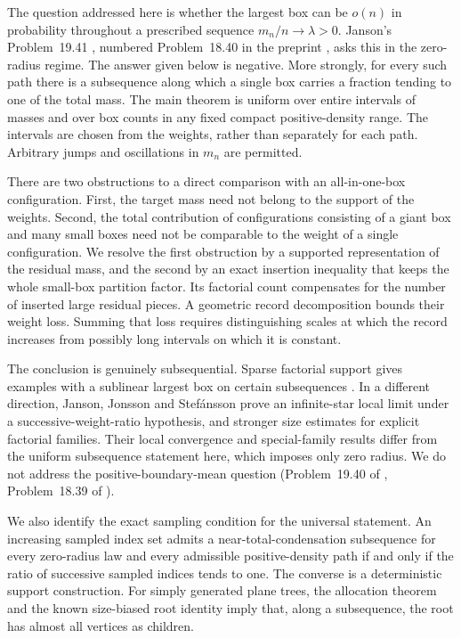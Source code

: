 \documentclass[11pt]{amsart}
\theoremstyle{remark}\newtheorem{remark}[theorem]{Remark}
\begin{document}
The question addressed here is whether the largest box can be $o(n)$ in
probability throughout a prescribed sequence $m_n/n\to\lambda>0$.
Janson's Problem~19.41 \cite[p.~228]{Janson}, numbered Problem~18.40
in the preprint \cite{JansonPreprint}, asks this in the zero-radius regime.
The answer given below is negative. More strongly, for every such path
there is a subsequence along which a single box carries a fraction tending
to one of the total mass. The main theorem is uniform over entire intervals
of masses and over box counts in any fixed compact positive-density range.
The intervals are chosen from the weights, rather than separately for each
path. Arbitrary jumps and oscillations in $m_n$ are permitted.

There are two obstructions to a direct comparison with an all-in-one-box
configuration. First, the target mass need not belong to the support of the
weights. Second, the total contribution of configurations consisting of a
giant box and many small boxes need not be comparable to the weight of a
single configuration. We resolve the first obstruction by a supported
representation of the residual mass, and the second by an exact insertion
inequality that keeps the whole small-box partition factor. Its factorial
count compensates for the number of inserted large residual pieces.
A geometric record decomposition bounds their weight loss. Summing that
loss requires distinguishing scales at which the record increases from
possibly long intervals on which it is constant.

The conclusion is genuinely subsequential. Sparse factorial support gives
examples with a sublinear largest box on certain subsequences
\cite[Example~19.39]{Janson}. In a different direction, Janson, Jonsson and
Stef\'ansson \cite{JJS} prove an infinite-star local limit under a
successive-weight-ratio hypothesis, and stronger size estimates for
explicit factorial families. Their local convergence and special-family
results differ from the uniform subsequence statement here, which imposes
only zero radius. We do not address the positive-boundary-mean question
(Problem~19.40 of \cite{Janson}, Problem~18.39 of \cite{JansonPreprint}).

We also identify the exact sampling condition for the universal statement.
An increasing sampled index set admits a near-total-condensation
subsequence for every zero-radius law and every admissible positive-density
path if and only if the ratio of successive sampled indices tends to one.
The converse is a deterministic support construction. For simply generated
plane trees, the allocation theorem and the known size-biased root identity
imply that, along a subsequence, the root has almost all vertices as children.
\end{document}
